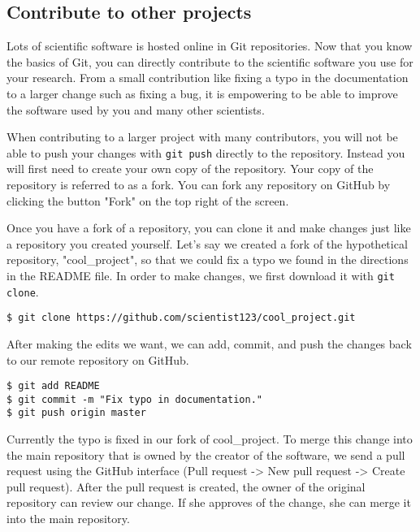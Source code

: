 \subsection{Contribute to other projects}

Lots of scientific software is hosted online in Git repositories.
Now that you know the basics of Git, you can directly contribute to the scientific software you use for your research.
From a small contribution like fixing a typo in the documentation to a larger change such as fixing a bug, it is empowering to be able to improve the software used by you and many other scientists.

When contributing to a larger project with many contributors, you will not be able to push your changes with \verb|git push| directly to the repository.
Instead you will first need to create your own copy of the repository.
Your copy of the repository is referred to as a fork.
You can fork any repository on GitHub by clicking the button "Fork" on the top right of the screen.

Once you have a fork of a repository, you can clone it and make changes just like a repository you created yourself.
Let's say we created a fork of the hypothetical repository, "cool\_project", so that we could fix a typo we found in the directions in the README file.
In order to make changes, we first download it with \verb|git clone|.

\begin{lstlisting}
$ git clone https://github.com/scientist123/cool_project.git
\end{lstlisting}

After making the edits we want, we can add, commit, and push the changes back to our remote repository on GitHub.

\begin{lstlisting}
$ git add README
$ git commit -m "Fix typo in documentation."
$ git push origin master
\end{lstlisting}

Currently the typo is fixed in our fork of cool\_project.
To merge this change into the main repository that is owned by the creator of the software, we send a pull request using the GitHub interface (Pull request -> New pull request -> Create pull request).
After the pull request is created, the owner of the original repository can review our change.
If she approves of the change, she can merge it into the main repository.
